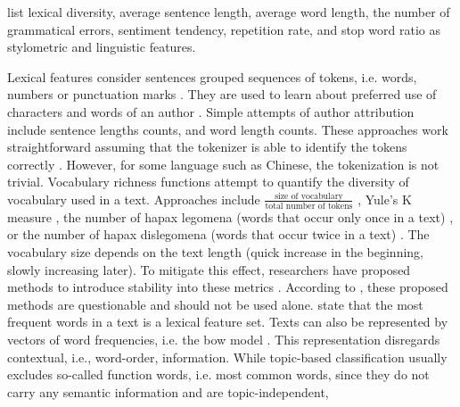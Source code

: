 \citet{bevendorff_overview_2024} list lexical diversity, average sentence length, average word length, 
the number of grammatical errors, sentiment tendency, repetition rate, and stop word ratio as 
stylometric and linguistic features.

Lexical features consider sentences grouped sequences of tokens, i.e. words, numbers or punctuation marks \cite{bevendorff_overview_2024}.
They are used to learn about preferred use of characters and words of an author \cite{elmanarelbouanani_authorship_2014}.
Simple attempts of author attribution include sentence lengths counts, and word length counts.
These approaches work straightforward assuming that the tokenizer is able to identify the tokens correctly \cite{bevendorff_overview_2024,elmanarelbouanani_authorship_2014}.
However, for some language such as Chinese, the tokenization is not trivial.
Vocabulary richness functions attempt to quantify the diversity of vocabulary used in a text.
Approaches include $\frac{\text{size of vocabulary}}{\text{total number of tokens}}$ \cite{elmanarelbouanani_authorship_2014,bevendorff_overview_2024},
Yule's K measure \cite{elmanarelbouanani_authorship_2014},
the number of hapax legomena (words that occur only once in a text) \cite{elmanarelbouanani_authorship_2014,bevendorff_overview_2024,weerasinghe_feature_vector_difference_2021}, 
or the number of hapax dislegomena (words that occur twice in a text) \cite{elmanarelbouanani_authorship_2014,weerasinghe_feature_vector_difference_2021}.
The vocabulary size depends on the text length (quick increase in the beginning, slowly increasing later).
To mitigate this effect, researchers have proposed methods to introduce stability into these metrics \cite{elmanarelbouanani_authorship_2014,bevendorff_overview_2024}. 
According to \citet{stamatatos_survey_2009}, these proposed methods are questionable and should not be used alone.
\citet{elmanarelbouanani_authorship_2014} state that the most frequent words in a text is a lexical feature set.
Texts can also be represented by vectors of word frequencies, i.e. the \ac{bow} model \cite{bevendorff_overview_2024}.
This representation disregards contextual, i.e., word-order, information.
While topic-based classification usually excludes so-called function words, 
i.e. most common words, since they do not carry any semantic information and are topic-independent, 
